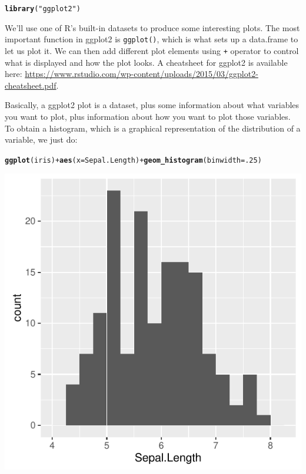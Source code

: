 \documentclass[12pt]{article}\usepackage[]{graphicx}\usepackage[]{color}
\makeatletter
\def\maxwidth{ %
  \ifdim\Gin@nat@width>\linewidth
    \linewidth
  \else
    \Gin@nat@width
  \fi
}
\newcommand{\hlnum}[1]{\textcolor[rgb]{0.686,0.059,0.569}{#1}}%
\newcommand{\hlstr}[1]{\textcolor[rgb]{0.192,0.494,0.8}{#1}}%
\newcommand{\hlopt}[1]{\textcolor[rgb]{0,0,0}{#1}}%
\newcommand{\hlstd}[1]{\textcolor[rgb]{0.345,0.345,0.345}{#1}}%
\newcommand{\hlkwc}[1]{\textcolor[rgb]{0.333,0.667,0.333}{#1}}%
\newcommand{\hlkwd}[1]{\textcolor[rgb]{0.737,0.353,0.396}{\textbf{#1}}}%
\newenvironment{kframe}{%
 \def\at@end@of@kframe{}%
 \ifinner\ifhmode%
  \def\at@end@of@kframe{\end{minipage}}%
  \begin{minipage}{\columnwidth}%
 \fi\fi%
 \def\FrameCommand##1{\hskip\@totalleftmargin \hskip-\fboxsep
 \colorbox{shadecolor}{##1}\hskip-\fboxsep
     \hskip-\linewidth \hskip-\@totalleftmargin \hskip\columnwidth}%
 \MakeFramed {\advance\hsize-\width
   \@totalleftmargin\z@ \linewidth\hsize
   \@setminipage}}%
 {\par\unskip\endMakeFramed%
 \at@end@of@kframe}
\newenvironment{knitrout}{}{} %
\makeatother
\begin{document}
\begin{knitrout}
\color{fgcolor}\begin{kframe}
\begin{alltt}
\hlkwd{library}\hlstd{(}\hlstr{"ggplot2"}\hlstd{)}
\end{alltt}
\end{kframe}
\end{knitrout}


We'll use one of R's built-in datasets to produce some interesting plots. The most important function in ggplot2 is \texttt{ggplot()}, which is what sets up a data.frame to let us plot it. We can then add different plot elements using \texttt{+} operator to control what is displayed and how the plot looks. A cheatsheet for ggplot2 is available here: \url{https://www.rstudio.com/wp-content/uploads/2015/03/ggplot2-cheatsheet.pdf}. 

Basically, a ggplot2 plot is a dataset, plus some information about what variables you want to plot, plus information about how you want to plot those variables. To obtain a histogram, which is a graphical representation of the distribution of a variable, we just do:

\begin{knitrout}
\color{fgcolor}\begin{kframe}
\begin{alltt}
\hlkwd{ggplot}\hlstd{(iris)} \hlopt{+} \hlkwd{aes}\hlstd{(}\hlkwc{x} \hlstd{= Sepal.Length)} \hlopt{+} \hlkwd{geom_histogram}\hlstd{(}\hlkwc{binwidth} \hlstd{=} \hlnum{.25}\hlstd{)}
\end{alltt}
\end{kframe}
\includegraphics[width=\maxwidth]{figure/unnamed-chunk-2-1} 

\end{knitrout}
\end{document}
